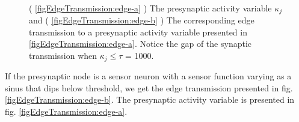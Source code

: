 \begin{figure}[hb!tp] 				%
	\centering
   	  \\
	\caption{ 	( \ref{figEdgeTransmission:edge-a} ) The presynaptic activity variable $\kappa_j$         and   
				( \ref{figEdgeTransmission:edge-b} ) The corresponding edge transmission to a presynaptic activity variable presented in \ref{figEdgeTransmission:edge-a}. 
			Notice the gap of the synaptic transmission when $\kappa_j \leq \tau$ = 1000. 
			} %
	\label{figEdgeTransmission}
\end{figure}
			If the presynaptic node is a sensor neuron with a sensor function varying as a sinus that dips below threshold, we get the edge transmission presented in fig. \ref{figEdgeTransmission:edge-b}. 
			The presynaptic activity variable is presented in fig. \ref{figEdgeTransmission:edge-a}.

